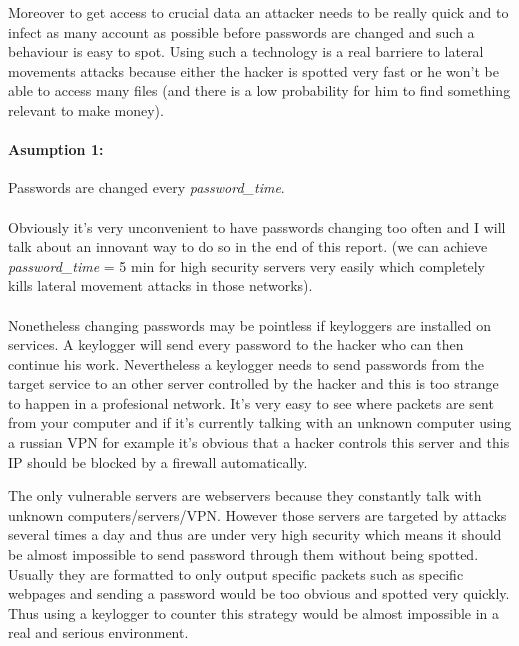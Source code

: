 \documentclass[11pt]{article}
\begin{document}
Moreover to get access to crucial data an attacker needs to be really quick and to infect as many account as possible before passwords are changed and such a behaviour is easy to spot. Using such a technology is a real barriere to lateral movements attacks because either the hacker is spotted very fast or he won't be able to access many files (and there is a low probability for him to find something relevant to make money).
\paragraph{Asumption 1:}
Passwords are changed every \textit{password\_time}.
\paragraph{}
Obviously it's very unconvenient to have passwords changing too often and I will talk about an innovant way to do so in the end of this report. (we can achieve \textit{password\_time} = 5 min for high security servers very easily which completely kills lateral movement attacks in those networks).\\
\paragraph{}
Nonetheless changing passwords may be pointless if keyloggers are installed on services. A keylogger will send every password to the hacker who can then continue his work. Nevertheless a keylogger needs to send passwords from the target service to an other server controlled by the hacker and this is too strange to happen in a profesional network. It's very easy to see where packets are sent from your computer and if it's currently talking with an unknown computer using a russian VPN for example it's obvious that a hacker controls this server and this IP should be blocked by a firewall automatically. 

The only vulnerable servers are webservers because they constantly talk with unknown computers/servers/VPN. However those servers are targeted by attacks several times a day and thus are under very high security which means it should be almost impossible to send password through them without being spotted. Usually they are formatted to only output specific packets such as specific webpages and sending a password would be too obvious and spotted very quickly. Thus using a keylogger to counter this strategy would be almost impossible in a real and serious environment.
\end{document}
